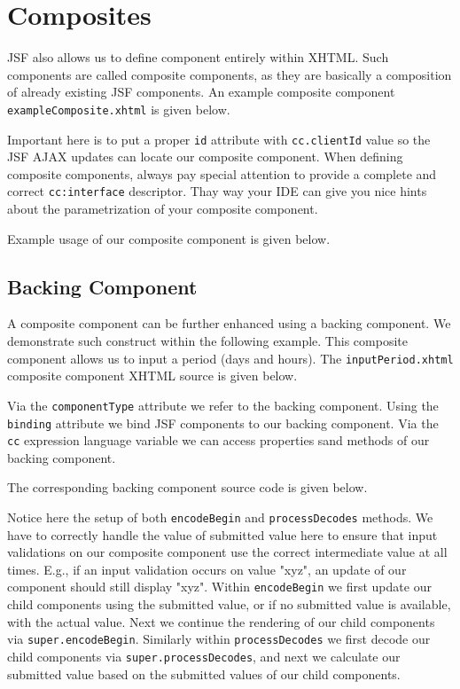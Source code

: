 \section{Composites}
JSF also allows us to define component entirely within XHTML.
Such components are called composite components, as they are basically a composition of already existing JSF components.
An example composite component \texttt{exampleComposite.xhtml} is given below.

Important here is to put a proper \texttt{id} attribute with \texttt{cc.clientId} value so the JSF AJAX updates can locate our composite component.
When defining composite components, always pay special attention to provide a complete and correct \texttt{cc:interface} descriptor.
Thay way your IDE can give you nice hints about the parametrization of your composite component.

Example usage of our composite component is given below.


\subsection{Backing Component}
A composite component can be further enhanced using a backing component.
We demonstrate such construct within the following example.
This composite component allows us to input a period (days and hours).
The \texttt{inputPeriod.xhtml} composite component XHTML source is given below.

Via the \texttt{componentType} attribute we refer to the backing component.
Using the \texttt{binding} attribute we bind JSF components to our backing component.
Via the \texttt{cc} expression language variable we can access properties sand methods of our backing component.

The corresponding backing component source code is given below.

Notice here the setup of both \texttt{encodeBegin} and \texttt{processDecodes} methods.
We have to correctly handle the value of submitted value here to ensure that input validations on our composite component use the correct intermediate value at all times. E.g., if an input validation occurs on value "xyz", an update of our component should still display "xyz".
Within \texttt{encodeBegin} we first update our child components using the submitted value, or if no submitted value is available, with the actual value.
Next we continue the rendering of our child components via \texttt{super.encodeBegin}.
Similarly within \texttt{processDecodes} we first decode our child components via \texttt{super.processDecodes}, and next we calculate our submitted value based on the submitted values of our child components.

